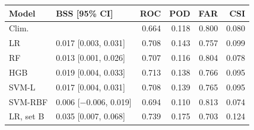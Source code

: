 \begin{tabular}{llrrrr}
\toprule
Model & BSS [95\% CI] & ROC & POD & FAR & CSI \\
\midrule
Clim. &  & 0.664 & 0.118 & 0.800 & 0.080 \\
\midrule
LR & 0.017 [0.003, 0.031] & 0.708 & 0.143 & 0.757 & 0.099 \\
RF & 0.013 [0.001, 0.026] & 0.707 & 0.116 & 0.804 & 0.078 \\
HGB & 0.019 [0.004, 0.033] & 0.713 & 0.138 & 0.766 & 0.095 \\
SVM-L & 0.017 [0.004, 0.031] & 0.708 & 0.139 & 0.765 & 0.095 \\
SVM-RBF & 0.006 [$-$0.006, 0.019] & 0.694 & 0.110 & 0.813 & 0.074 \\
\midrule
LR, set B & 0.035 [0.007, 0.068] & 0.739 & 0.175 & 0.703 & 0.124 \\
\bottomrule
\end{tabular}
